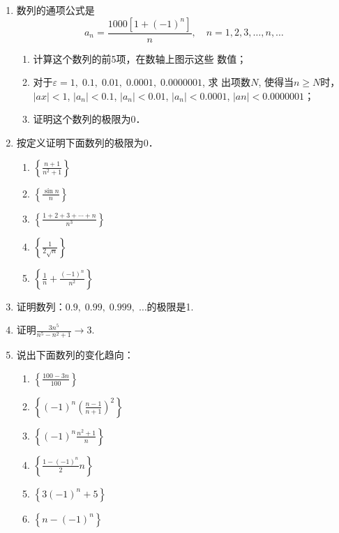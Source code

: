 \begin{enumerate}
    \item 数列的通项公式是
\[a_n=\frac{1000[1+(-1)^n]}{n},\quad n=1,2,3,\ldots,n,\ldots\]
\begin{enumerate}
    \item 计算这个数列的前5项，在数轴上图示这些
    数值；
    \item 对于$\varepsilon=1,\; 0.1,\; 0.01,\; 0.0001,\; 0.0000001$, 求
    出项数$N$, 使得当$n\ge N$时，$|ax|<1$, $|a_n|<0.1$, $|a_n|<0.01$, $|a_n|<0.0001$, $|an|<0.0000001$；
    \item 证明这个数列的极限为0．
\end{enumerate}

    \item 按定义证明下面数列的极限为0．
\begin{multicols}{2}
\begin{enumerate}
    \item $\left\{\frac{n+1}{n^2+1}\right\}$
    \item $\left\{\frac{\sin n}{n}\right\}$
    \item $\left\{\frac{1+2+3+\cdots+n}{n^3}\right\}$
    \item $\left\{\frac{1}{2\sqrt{n}}\right\}$
    \item $\left\{\frac{1}{n}+\frac{(-1)^n}{n^2}\right\}$
\end{enumerate}
\end{multicols}
    \item 证明数列：$0.9,\;0.99,\;0.999,\;\ldots$的极限是1.

    \item 证明$\frac{3n^5}{n^5-n^2+1}\to 3$.
    \item 说出下面数列的变化趋向：
\begin{multicols}{2}
\begin{enumerate}
    \item $\left\{\frac{100-3n}{100}\right\}$
    \item $\left\{(-1)^n\left(\frac{n-1}{n+1}\right)^2\right\}$
    \item $\left\{(-1)^n\frac{n^2+1}{n}\right\}$
    \item $\left\{\frac{1-(-1)^n}{2}n\right\}$
    \item $\left\{3(-1)^n+5\right\}$
    \item $\left\{n-(-1)^n\right\}$
\end{enumerate}
\end{multicols}
\end{enumerate}

